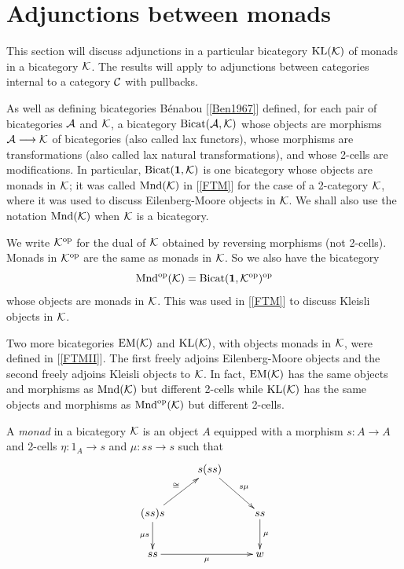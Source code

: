 \documentclass[a4paper,10pt]{article}
\newcommand{\bc}{{\cal{C}}}
\newcommand{\ba}{{\cal{A}}}
\newcommand{\bk}{{\cal{K}}}
\numberwithin{equation}{section}
\begin{document}
\section{Adjunctions between monads}\label{abm} 

This section will discuss adjunctions in a particular bicategory 
$\mathrm{KL} (\bk)$ of monads in a bicategory $\bk$. 
The results will apply to adjunctions between categories internal to a category $\bc$ with pullbacks.

As well as defining bicategories B\'enabou [\ref{Ben1967}] defined, 
for each pair of bicategories $\ba$ and $\bk$, a bicategory $\mathrm{Bicat} (\ba,\bk)$ 
whose objects are morphisms $\ba \longrightarrow \bk$ of bicategories (also called lax functors), whose morphisms are transformations (also called lax natural transformations), 
and whose 2-cells are modifications. 
In particular, $\mathrm{Bicat} (\bf{1} ,\bk)$ is one bicategory whose objects are monads in $\bk$; 
it was called $\mathrm{Mnd}(\bk)$ in [\ref{FTM}] for the case of a 2-category $\bk$, 
where it was used to discuss Eilenberg-Moore objects in $\bk$. 
We shall also use the notation $\mathrm{Mnd}(\bk)$ when $\bk$ is a bicategory.  

We write $\bk^{\mathrm{op}}$ for the dual of $\bk$ obtained by reversing morphisms (not 2-cells). 
Monads in $\bk^{\mathrm{op}}$ are the same as monads in $\bk$. 
So we also have the bicategory 
$$\mathrm{Mnd}^{\mathrm{op}}(\bk) = \mathrm{Bicat} (\bf{1} ,\bk^{\mathrm{op}})^{\mathrm{op}}$$
whose objects are monads in $\bk$. This was used in [\ref{FTM}] to discuss Kleisli objects in $\bk$.

Two more bicategories $\mathrm{EM} (\bk)$ and $\mathrm{KL} (\bk)$, with objects monads in $\bk$, were defined in [\ref{FTMII}]. 
The first freely adjoins Eilenberg-Moore objects and the second freely adjoins Kleisli objects to $\bk$. 
In fact, $\mathrm{EM} (\bk)$ has the same objects and morphisms as $\mathrm{Mnd}(\bk)$ 
but different 2-cells while $\mathrm{KL} (\bk)$ has the same objects and morphisms as 
$\mathrm{Mnd}^{\mathrm{op}}(\bk)$ but different 2-cells.  

A {\it monad} in a bicategory $\bk$ is an object $A$ equipped with a morphism 
$s:A \longrightarrow A$ and 2-cells $\eta : 1_A \longrightarrow s$ and $\mu : ss \longrightarrow s$ 
such that 
\begin{equation}
\xymatrix{
& s(ss) \ar[rd]^-{ s \mu}  & \\
(ss)s \ar[ru]^-{\cong} \ar[d]_-{\mu s} & & ss \ar[d]^-{\mu} \\
ss \ar[rr]_-{\mu} & & w }
\end{equation}
\end{document}
